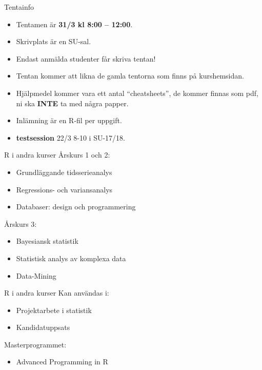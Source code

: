 \documentclass[
  11pt,
  ignorenonframetext,
  handout]{beamer}
\providecommand{\tightlist}{%
  \setlength{\itemsep}{0pt}\setlength{\parskip}{0pt}}
\begin{document}
\begin{frame}{Tentainfo}
\protect\hypertarget{tentainfo}{}
\begin{itemize}
\tightlist
\item
  Tentamen är \textbf{31/3 kl 8:00 -- 12:00}.
\item
  Skrivplats är en SU-sal.
\item
  Endast anmälda studenter får skriva tentan!
\item
  Tentan kommer att likna de gamla tentorna som finns på kurshemsidan.
\item
  Hjälpmedel kommer vara ett antal ``cheatsheets'', de kommer finnas som
  pdf, ni ska \textbf{INTE} ta med några papper.
\item
  Inlämning är en R-fil per uppgift.
\item
  \textbf{testsession} 22/3 8-10 i SU-17/18.
\end{itemize}
\end{frame}

\begin{frame}{R i andra kurser}
\protect\hypertarget{r-i-andra-kurser}{}
Årskurs 1 och 2:

\begin{itemize}
\tightlist
\item
  Grundläggande tidsserieanalys
\item
  Regressions- och variansanalys
\item
  Databaser: design och programmering
\end{itemize}

Årskurs 3:

\begin{itemize}
\tightlist
\item
  Bayesiansk statistik
\item
  Statistisk analys av komplexa data
\item
  Data-Mining
\end{itemize}
\end{frame}

\begin{frame}{R i andra kurser}
\protect\hypertarget{r-i-andra-kurser-1}{}
Kan användas i:

\begin{itemize}
\tightlist
\item
  Projektarbete i statistik
\item
  Kandidatuppsats
\end{itemize}

Masterprogrammet:

\begin{itemize}
\tightlist
\item
  Advanced Programming in R
\end{itemize}
\end{frame}
\end{document}
